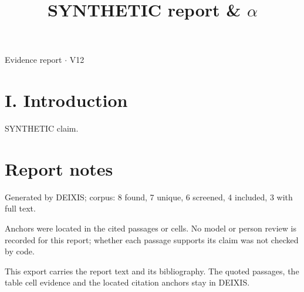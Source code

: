 \documentclass[journal]{IEEEtran}
\begin{document}
\title{SYNTHETIC report \& \ensuremath{\alpha}}

\maketitle

\noindent Evidence report \ensuremath{\cdot} V12

\section*{I. Introduction}

SYNTHETIC claim. \cite{Synth26}

\section*{Report notes}

Generated by DEIXIS; corpus: 8 found, 7 unique, 6 screened, 4 included, 3 with full text.

Anchors were located in the cited passages or cells. No model or person review is recorded for this report; whether each passage supports its claim was not checked by code.

This export carries the report text and its bibliography. The quoted passages, the table cell evidence and the located citation anchors stay in DEIXIS.




\end{document}

